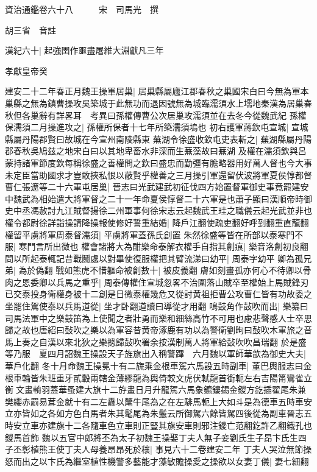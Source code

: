 資治通鑑卷六十八　　　宋　司馬光　撰

胡三省　音註

漢紀六十|{
	起強圉作噩盡屠維大淵獻凡三年}


孝獻皇帝癸

建安二十二年春正月魏王操軍居巢|{
	居巢縣屬廬江郡春秋之巢國宋白曰今無為軍本巢縣之無為鎮曹操攻吳築城于此無功而退因號無為城臨濡須水上壖地秦漢為居巢春秋但各巢辭有詳畧耳　考異曰孫權傳曹公次居巢攻濡須並在去冬今從魏武紀}
孫權保濡須二月操進攻之|{
	孫權所保者十七年所築濡須塢也}
初右護軍蔣欽屯宣城|{
	宣城縣屬丹陽郡賢曰故城在今宣州南陵縣東}
蕪湖令徐盛收欽屯吏表斬之|{
	蕪湖縣屬丹陽郡春秋吳鳩兹之地宋白曰以其地卑畜水非深而生蕪藻故曰蕪湖}
及權在濡須欽與呂蒙持諸軍節度欽每稱徐盛之善權問之欽曰盛忠而勤彊有膽略器用好萬人督也今大事未定臣當助國求才豈敢挾私恨以蔽賢乎權善之三月操引軍還留伏波將軍夏侯惇都督曹仁張遼等二十六軍屯居巢|{
	晉志曰光武建武初征伐四方始置督軍御史事竟罷建安中魏武為相始遣大將軍督之二十一年命夏侯惇督二十六軍是也蕭子顯曰漢順帝時御史中丞馮赦討九江賊督揚徐二州軍事何徐宋志云起魏武王珪之職儀云起光武並非也}
權令都尉徐詳詣操請降操報使修好誓重結婚|{
	降戶江翻使疏吏翻好呼到翻重直龍翻}
權留平虜將軍周泰督濡須|{
	平虜將軍蓋孫氏創置}
朱然徐盛等皆在所部以泰寒門不服|{
	寒門言所出微也}
權會諸將大為酣樂命泰解衣權手自指其創痕|{
	樂音洛創初良翻}
問以所起泰輒記昔戰鬭處以對畢使復服權把其臂流涕曰幼平|{
	周泰字幼平}
卿為孤兄弟|{
	為於偽翻}
戰如熊虎不惜軀命被創數十|{
	被皮義翻}
膚如刻畫孤亦何心不待卿以骨肉之恩委卿以兵馬之重乎|{
	周泰傳權住宣城忽畧不治圍落山賊卒至權始上馬賊鋒刃已交泰投身衛權身被十二創是日微泰權幾危又從討黄祖拒曹公攻曹仁皆有功故委之}
坐罷住駕使泰以兵馬道從|{
	坐才卧翻道讀曰導從才用翻}
鳴鼓角作鼔吹而出|{
	樂纂曰司馬法軍中之樂鼓笛為上使聞之者壯勇而樂和細絲高竹不可用也慮悲聲感人士卒思歸之故也唐紹曰鼔吹之樂以為軍容昔黄帝涿鹿有功以為警衛劉昫曰鼔吹木軍旅之音馬上奏之自漢以來北狄之樂摠歸鼔吹署余按漢制萬人將軍給鼔吹吹昌瑞翻}
於是盛等乃服　夏四月詔魏王操設天子旌旗出入稱警蹕　六月魏以軍師華歆為御史大夫|{
	華戶化翻}
冬十月命魏王操冕十有二旒乘金根車駕六馬設五時副車|{
	董巴輿服志曰金根車輪皆朱班重牙貳轂兩轄金薄繆龍為輿倚較文虎伏軾龍首銜軛左右吉陽筩鸞雀立衡文畫輈羽蓋華蚤建大旗十二斿畫日月升龍駕六馬象鑣鏤錫金鑁方釳插翟尾朱兼樊纓赤罽易茸金就十有二左纛以氂牛尾為之在左騑馬軛上大如斗是為德車五時車安立亦皆如之各如方色白馬者朱其髦尾為朱鬛云所御駕六餘皆駕四後從為副車晉志五時安立車亦建旗十二各隨車色立車則正豎其旗安車則邪注鑁亡范翻釳許乙翻鐵孔也鑁馬首飾}
魏以五官中郎將丕為太子初魏王操娶丁夫人無子妾劉氏生子昂卞氏生四子丕彰植熊王使丁夫人母養昂昂死於穰|{
	事見六十二卷建安二年}
丁夫人哭泣無節操怒而出之以卞氏為繼室植性機警多藝能才藻敏贍操愛之操欲以女妻丁儀|{
	妻七細翻}
